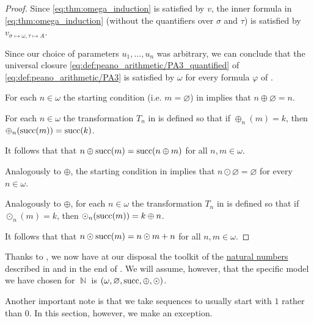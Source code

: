 \begin{proof}
  Since \eqref{eq:thm:omega_induction} is satisfied by \( v \), the inner formula in \eqref{eq:thm:omega_induction} (without the quantifiers over \( \sigma \) and \( \tau \)) is satisfied by \( v_{\sigma \mapsto \omega, \tau \mapsto A} \).

  Since our choice of parameters \( u_1, \ldots, u_n \) was arbitrary, we can conclude that the universal closure \eqref{eq:def:peano_arithmetic/PA3_quantified} of \eqref{eq:def:peano_arithmetic/PA3} is satisfied by \( \omega \) for every formula \( \varphi \) of .

   For each \( n \in \omega \) the starting condition (i.e. \( m = \varnothing \)) in  implies that \( n \oplus \varnothing = n \).

   For each \( n \in \omega \) the transformation \( T_n \) in  is defined so that if \( \oplus_n(m) = k \), then \( \oplus_n(\operatorname{succ}(m)) = \operatorname{succ}(k) \).

  It follows that that \( n \oplus \operatorname{succ}(m) = \operatorname{succ}(n \oplus m) \) for all \( n, m \in \omega \).

   Analogously to \( \oplus \), the starting condition in  implies that \( n \odot \varnothing = \varnothing \) for every \( n \in \omega \).

   Analogously to \( \oplus \), for each \( n \in \omega \) the transformation \( T_n \) in  is defined so that if \( \odot_n(m) = k \), then \( \odot_n(\operatorname{succ}(m)) = k \oplus n \).

  It follows that that \( n \odot \operatorname{succ}(m) = n \odot m + n \) for all \( n, m \in \omega \).
\end{proof}

\begin{remark}\label{rem:natural_number_availability_zfc}
  Thanks to , we now have at our disposal the toolkit of the \hyperref[def:natural_numbers]{natural numbers} described in  and in the end of . We will assume, however, that the specific model we have chosen for \( \BbbN \) is \( (\omega, \varnothing, \operatorname{succ}, \oplus, \odot) \).

  Another important note is that we take sequences to usually start with \( 1 \) rather than \( 0 \). In this section, however, we make an exception.
\end{remark}

